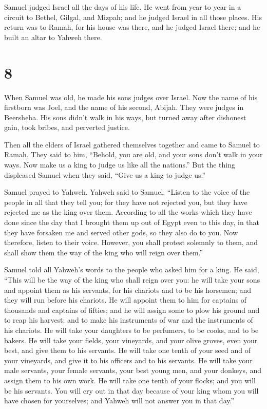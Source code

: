  Samuel judged Israel all the days of his life.
 He went from year to year in a circuit to Bethel,
Gilgal, and Mizpah; and he judged Israel in all those places.
 His return was to Ramah, for his house was there, and he
judged Israel there; and he built an altar to Yahweh there.

\hypertarget{section-7}{%
\section{8}\label{section-7}}

 When Samuel was old, he made his sons judges over Israel.
 Now the name of his firstborn was Joel, and the name of
his second, Abijah. They were judges in Beersheba.  His
sons didn't walk in his ways, but turned away after dishonest gain, took
bribes, and perverted justice.

 Then all the elders of Israel gathered themselves
together and came to Samuel to Ramah.  They said to him,
``Behold, you are old, and your sons don't walk in your ways. Now make
us a king to judge us like all the nations.''  But the
thing displeased Samuel when they said, ``Give us a king to judge us.''

Samuel prayed to Yahweh.  Yahweh said to Samuel, ``Listen
to the voice of the people in all that they tell you; for they have not
rejected you, but they have rejected me as the king over them.
 According to all the works which they have done since the
day that I brought them up out of Egypt even to this day, in that they
have forsaken me and served other gods, so they also do to you.
 Now therefore, listen to their voice. However, you shall
protest solemnly to them, and shall show them the way of the king who
will reign over them.''

 Samuel told all Yahweh's words to the people who asked
him for a king.  He said, ``This will be the way of the
king who shall reign over you: he will take your sons and appoint them
as his servants, for his chariots and to be his horsemen; and they will
run before his chariots.  He will appoint them to him for
captains of thousands and captains of fifties; and he will assign some
to plow his ground and to reap his harvest; and to make his instruments
of war and the instruments of his chariots.  He will take
your daughters to be perfumers, to be cooks, and to be bakers.
 He will take your fields, your vineyards, and your olive
groves, even your best, and give them to his servants. 
He will take one tenth of your seed and of your vineyards, and give it
to his officers and to his servants.  He will take your
male servants, your female servants, your best young men, and your
donkeys, and assign them to his own work.  He will take
one tenth of your flocks; and you will be his servants. 
You will cry out in that day because of your king whom you will have
chosen for yourselves; and Yahweh will not answer you in that day.''

